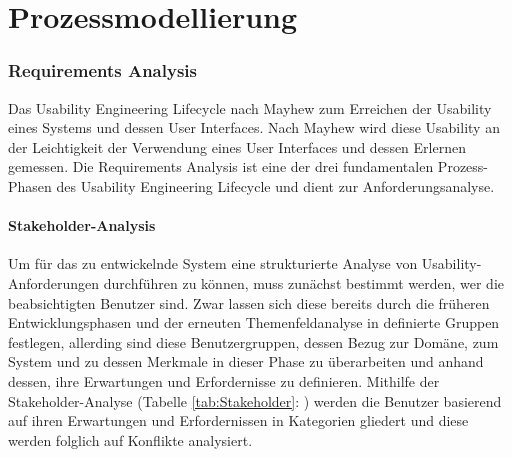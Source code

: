 \documentclass[a4paper,11pt]{article}%
\renewcommand{\\}{\vspace*{0.5\baselineskip} \newline}
\begin{document}
\vspace*{\fill}
\part{Prozessmodellierung}
\vfill
\newpage
\section{Requirements Analysis}
	Das Usability Engineering Lifecycle nach Mayhew zum Erreichen der Usability eines Systems und dessen User Interfaces. Nach Mayhew wird diese Usability an der Leichtigkeit der Verwendung eines User Interfaces und dessen Erlernen gemessen. Die Requirements Analysis ist eine der drei fundamentalen Prozess-Phasen des Usability Engineering Lifecycle und dient zur Anforderungsanalyse.\cite{MD}
	\subsection{Stakeholder-Analysis}
		Um für das zu entwickelnde System eine strukturierte Analyse von Usability-Anforderungen durchführen zu können, muss zunächst bestimmt werden, wer die beabsichtigten Benutzer sind. Zwar lassen sich diese bereits durch die früheren Entwicklungsphasen und der erneuten Themenfeldanalyse in definierte Gruppen festlegen, allerding sind diese Benutzergruppen, dessen Bezug zur Domäne, zum System und zu dessen Merkmale in dieser Phase zu überarbeiten und anhand dessen, ihre Erwartungen und Erfordernisse zu definieren. Mithilfe der Stakeholder-Analyse (Tabelle  \ref{tab:Stakeholder}: ) werden die Benutzer basierend auf ihren Erwartungen und Erfordernissen in Kategorien gliedert und diese werden folglich auf Konflikte analysiert. 
\end{document}
